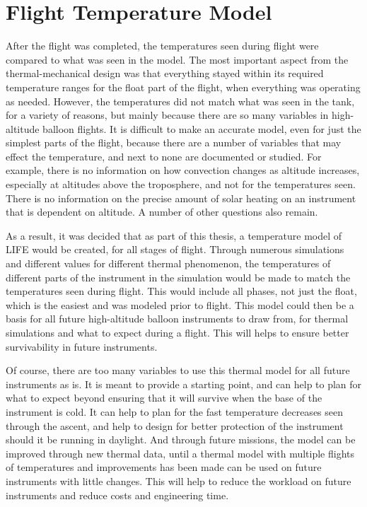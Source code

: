 \section{Flight Temperature Model}\label{flight_temp_model}
After the flight was completed, the temperatures seen during flight were compared to what was seen in the model. The most important aspect from the thermal-mechanical design was that everything stayed within its required temperature ranges for the float part of the flight, when everything was operating as needed. However, the temperatures did not match what was seen in the tank, for a variety of reasons, but mainly because there are so many variables in high-altitude balloon flights. It is difficult to make an accurate model, even for just the simplest parts of the flight, because there are a number of variables that may effect the temperature, and next to none are documented or studied. For example, there is no information on how convection changes as altitude increases, especially at altitudes above the troposphere, and not for the temperatures seen. There is no information on the precise amount of solar heating on an instrument that is dependent on altitude. A number of other questions also remain.

As a result, it was decided that as part of this thesis, a temperature model of LIFE would be created, for all stages of flight. Through numerous simulations and different values for different thermal phenomenon, the temperatures of different parts of the instrument in the simulation would be made to match the temperatures seen during flight. This would include all phases, not just the float, which is the easiest and was modeled prior to flight. This model could then be a basis for all future high-altitude balloon instruments to draw from, for thermal simulations and what to expect during a flight. This will helps to ensure better survivability in future instruments.

Of course, there are too many variables to use this thermal model for all future instruments as is. It is meant to provide a starting point, and can help to plan for what to expect beyond ensuring that it will survive when the base of the instrument is cold. It can help to plan for the fast temperature decreases seen through the ascent, and help to design for better protection of the instrument should it be running in daylight. And through future missions, the model can be improved through new thermal data, until a thermal model with multiple flights of temperatures and improvements has been made can be used on future instruments with little changes. This will help to reduce the workload on future instruments and reduce costs and engineering time. 

